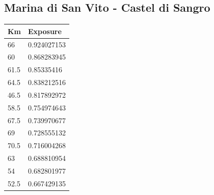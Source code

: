\subsection{Marina di San Vito - Castel di Sangro}
\begin{longtable}{|l|l|}
	\centering
	\rowcolor[HTML]{9B9B9B} \textbf{Km} & \textbf{Exposure} \\ \hline
	\rowcolor[HTML]{F8FF00} 
	66                                                      & 0.924027153                                                   \\
	\rowcolor[HTML]{F8FF00} 
	60                                                      & 0.868283945                                                   \\
	\rowcolor[HTML]{F8FF00} 
	61.5                                                    & 0.85335416                                                    \\
	\rowcolor[HTML]{F8FF00} 
	64.5                                                    & 0.838212516                                                   \\
	\rowcolor[HTML]{F8FF00} 
	46.5                                                    & 0.817892972                                                   \\
	\rowcolor[HTML]{F8FF00} 
	58.5                                                    & 0.754974643                                                   \\
	\rowcolor[HTML]{F8FF00} 
	67.5                                                    & 0.739970677                                                   \\
	\rowcolor[HTML]{F8FF00} 
	69                                                      & 0.728555132                                                   \\
	\rowcolor[HTML]{F8FF00} 
	70.5                                                    & 0.716004268                                                   \\
	\rowcolor[HTML]{F8FF00} 
	63                                                      & 0.688810954                                                   \\
	\rowcolor[HTML]{F8FF00} 
	54                                                      & 0.682801977                                                   \\
	\rowcolor[HTML]{F8FF00} 
	52.5                                                    & 0.667429135                                                   \\

\end{longtable}
